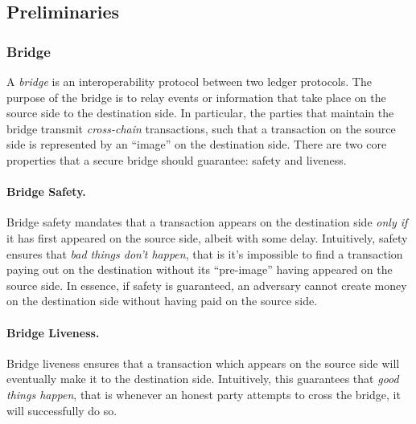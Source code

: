 \subsection{Preliminaries}

\subsubsection{Bridge}
A \emph{bridge} is an interoperability protocol between two ledger protocols.
The purpose of the bridge is to relay events or information that take place on
the source side to the destination side\cite{sok_bridges, Zamyatin2019SoKCA}. In particular, the parties that
maintain the bridge transmit \emph{cross-chain} transactions, such that a
transaction on the source side is represented by an ``image'' on the
destination side. There are two core properties that a secure bridge should 
guarantee: safety and liveness.

\paragraph{Bridge Safety.}
Bridge safety mandates that a transaction appears on the destination side \emph{only if} it has first
appeared on the source side, albeit with some delay.
%
Intuitively, safety ensures that \emph{bad
things don't happen}, that is it's impossible to find a transaction paying out on the
destination without its ``pre-image'' having appeared on the source side. 
In essence, if safety is guaranteed, an adversary cannot create money on the
destination side without having paid on the source side.
%

\paragraph{Bridge Liveness.}
Bridge liveness ensures that a transaction which appears on the source side will eventually make
it to the destination side. Intuitively, this guarantees that \emph{good things happen}, that is whenever an
honest party attempts to cross the bridge, it will successfully do so.

